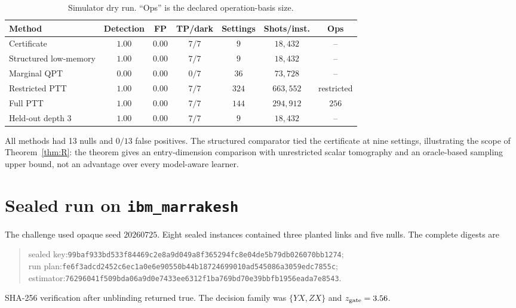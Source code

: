 \documentclass[aps,prl,onecolumn,superscriptaddress,nofootinbib]{revtex4-2}
\newcommand{\hashfour}[4]{\texttt{#1}\allowbreak\texttt{#2}\allowbreak\texttt{#3}\allowbreak\texttt{#4}}
\begin{document}
\begin{table}[t]
\caption{Simulator dry run.  ``Ops'' is the declared operation-basis size.}
\label{tab:dryrun}
\begin{ruledtabular}
\begin{tabular}{lcccccc}
Method & Detection & FP & TP/dark & Settings & Shots/inst. & Ops\\
\hline
Certificate & $1.00$ & $0.00$ & $7/7$ & $9$ & $18{,}432$ & --\\
Structured low-memory & $1.00$ & $0.00$ & $7/7$ & $9$ & $18{,}432$ & --\\
Marginal QPT & $0.00$ & $0.00$ & $0/7$ & $36$ & $73{,}728$ & --\\
Restricted PTT & $1.00$ & $0.00$ & $7/7$ & $324$ & $663{,}552$ & restricted\\
Full PTT & $1.00$ & $0.00$ & $7/7$ & $144$ & $294{,}912$ & $256$\\
Held-out depth 3 & $1.00$ & $0.00$ & $7/7$ & $9$ & $18{,}432$ & --\\
\end{tabular}
\end{ruledtabular}
\end{table}
All methods had 13 nulls and $0/13$ false positives.  The structured comparator tied the certificate at nine settings, illustrating the scope of Theorem~\ref{thm:R}: the theorem gives an entry-dimension comparison with unrestricted scalar tomography and an oracle-based sampling upper bound, not an advantage over every model-aware learner.

\section{Sealed run on \texttt{ibm\_marrakesh}}
\label{sec:marrakesh}

The challenge used opaque seed $20260725$.  Eight sealed instances contained three planted links and five nulls.  The complete digests are
\begin{quote}\small\raggedright
sealed key:\quad \hashfour{99baf933bd533f84}{469c2e8a9d049a8f}{365294fc8e04de5b}{79db026070bb1274};\\
run plan:\quad \hashfour{fe6f3adcd2452c6e}{c1a0e6e90550b44b}{18724699010ad545}{086a3059edc7855c};\\
estimator:\quad \hashfour{76296041f509bda0}{6a9d0e7433ee6312}{f1ba769bd70e39bb}{fb1956eada7e8543}.
\end{quote}
SHA-256 verification after unblinding returned true.  The decision family was $\{YX,ZX\}$ and $z_{\rm gate}=3.56$.
\end{document}
